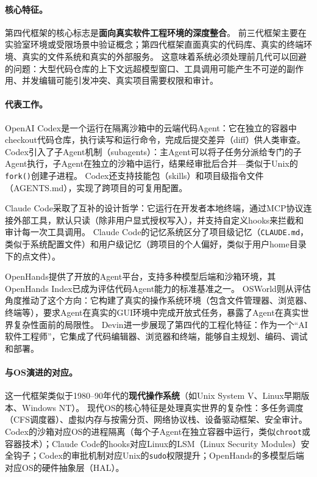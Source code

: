 \paragraph{核心特征。}
第四代框架的核心标志是\textbf{面向真实软件工程环境的深度整合}。
前三代框架主要在实验室环境或受限场景中验证概念；第四代框架直面真实的代码库、真实的终端环境、真实的文件系统和真实的外部服务。
这意味着系统必须处理前几代可以回避的问题：大型代码仓库的上下文远超模型窗口、工具调用可能产生不可逆的副作用、并发编辑可能引发冲突、真实项目需要权限和审计。

\paragraph{代表工作。}
OpenAI Codex\cite{openai_codex_overview_2026}是一个运行在隔离沙箱中的云端代码Agent：它在独立的容器中checkout代码仓库，执行读写和运行命令，完成后提交差异（diff）供人类审查。
Codex引入了子Agent机制（subagents）：主Agent可以将子任务分派给专门的子Agent执行，子Agent在独立的沙箱中运行，结果经审批后合并---类似于Unix的\texttt{fork()}创建子进程。
Codex还支持技能包（skills）\cite{openai_codex_skills_2026}和项目级指令文件（AGENTS.md）\cite{openai_codex_agents_md_2026}，实现了跨项目的可复用配置。

Claude Code\cite{anthropic_claudecode_overview_2026}采取了互补的设计哲学：它运行在开发者本地终端，通过MCP协议\cite{mcp_intro_2026}连接外部工具，默认只读（除非用户显式授权写入），并支持自定义hooks来拦截和审计每一次工具调用\cite{anthropic_claudecode_security_2026}。
Claude Code的记忆系统\cite{anthropic_claudecode_memory_2026}区分了项目级记忆（\texttt{CLAUDE.md}，类似于系统配置文件）和用户级记忆（跨项目的个人偏好，类似于用户home目录下的点文件）。

OpenHands\cite{openhands_paper_2025}提供了开放的Agent平台，支持多种模型后端和沙箱环境，其OpenHands Index已成为评估代码Agent能力的标准基准之一。
OSWorld\cite{osworld2024}则从评估角度推动了这个方向：它构建了真实的操作系统环境（包含文件管理器、浏览器、终端等），要求Agent在真实的GUI环境中完成开放式任务，暴露了Agent在真实世界复杂性面前的局限性。
Devin\cite{devin2024cognition}进一步展现了第四代的工程化特征：作为一个``AI软件工程师''，它集成了代码编辑器、浏览器和终端，能够自主规划、编码、调试和部署。

\paragraph{与OS演进的对应。}
这一代框架类似于1980--90年代的\textbf{现代操作系统}（如Unix System V、Linux早期版本、Windows NT）。
现代OS的核心特征是处理真实世界的复杂性：多任务调度（CFS调度器\cite{linux_cfs_2026}）、虚拟内存与按需分页、网络协议栈、设备驱动框架、安全审计。
Codex的沙箱对应OS的进程隔离（每个子Agent在独立容器中运行，类似\texttt{chroot}或容器技术）；Claude Code的hooks对应Linux的LSM（Linux Security Modules）安全钩子；Codex的审批机制对应Unix的\texttt{sudo}权限提升；OpenHands的多模型后端对应OS的硬件抽象层（HAL）。

